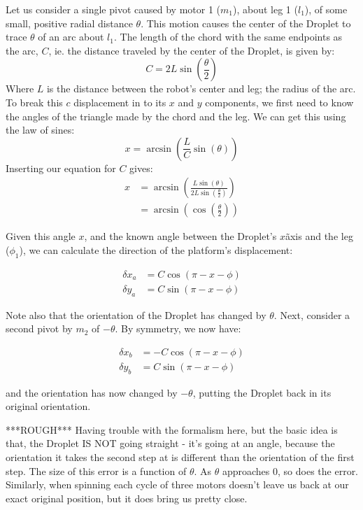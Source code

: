 \documentclass[letterpaper, 10pt, conference]{ieeeconf}
\begin{document}
Let us consider a single pivot caused by motor 1 ($m_1$), about leg 1 ($l_1$), of some small, positive radial distance $\theta$. This motion causes the center of the Droplet to trace $\theta$ of an arc about $l_1$. The length of the chord with the same endpoints as the arc, $C$, ie. the distance traveled by the center of the Droplet, is given by:
\[
C=2 L \sin\left(\frac{\theta}{2}\right)
\]
Where $L$ is the distance between the robot's center and leg; the radius of the arc. To break this $c$ displacement in to its $x$ and $y$ components, we first need to know the angles of the triangle made by the chord and the leg. We can get this using the law of sines:
\[
x = \arcsin\left(\frac{L}{C}\sin(\theta)\right) 
\]
Inserting our equation for $C$ gives:
\begin{align*}
x &=\arcsin\left(\frac{L\sin(\theta)}{2 L \sin(\frac{\theta}{2})}\right) \\
   &=\arcsin\left(\cos\left(\frac{\theta}{2}\right)\right)
\end{align*}

Given this angle $x$, and the known angle between the Droplet's $x$\~axis and the leg ($\phi_1$), we can calculate the direction of the platform's displacement:

\begin{align*}
\delta x_a &= C \cos(\pi - x - \phi)\\
\delta y_a &= C \sin(\pi - x - \phi)
\end{align*}

Note also that the orientation of the Droplet has changed by $\theta$. Next, consider a second pivot by $m_2$ of $-\theta$. By symmetry, we now have:

\begin{align*}
\delta x_b &= -C\cos(\pi -x -\phi)\\
\delta y_b &= C \sin(\pi - x - \phi)
\end{align*}

and the orientation has now changed by $-\theta$, putting the Droplet back in its original orientation. 

***ROUGH***
Having trouble with the formalism here, but the basic idea is that, the Droplet IS NOT going straight - it's going at an angle, because the orientation it takes the second step at is different than the orientation of the first step. The size of this error is a function of $\theta$. As $\theta$ approaches $0$, so does the error. Similarly, when spinning each cycle of three motors doesn't leave us back at our exact original position, but it does bring us pretty close.
\end{document}
